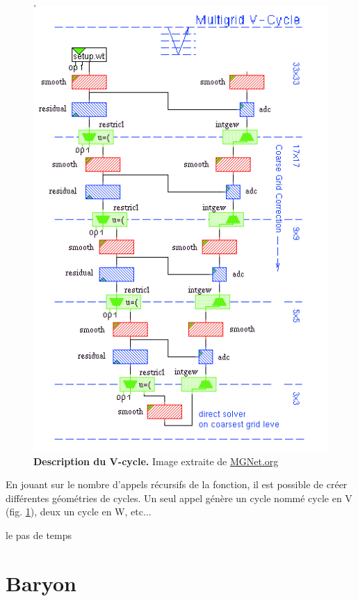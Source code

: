 \begin{figure}[htbp]
\begin{center}
\includegraphics[scale=0.35]{img/02/Vcycle.png}
\caption{\textbf{Description du V-cycle.} Image extraite de \href{http://MGNet.org}{MGNet.org}}
\label{Description du V-cycle}
\end{center}
\end{figure}		

En jouant sur le nombre d'appels récursifs de la fonction, il est possible de créer différentes géométries de cycles. Un seul appel génère un cycle nommé cycle en V (fig. \ref{Description du V-cycle}), deux un cycle en W, etc... 

			



le pas de temps\\

\section{Baryon}

